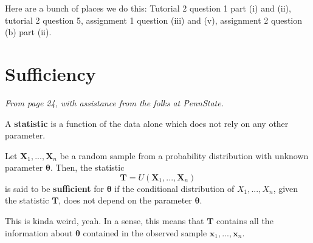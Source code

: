 \begin{exercise}
    Here are a bunch of places we do this: Tutorial 2 question 1 part (i) and (ii), tutorial 2 question 5, assignment 1 question (iii) and (v), assignment 2 question (b) part (ii).
\end{exercise}

\section{Sufficiency}\label{sec:sufficiency}

\textit{From page 24, with assistance from the folks at PennState\autocite{penn415}.}



A \textbf{statistic} is a function of the data alone which does not rely on any other parameter. 


\begin{definition}[Sufficient]\label{defn:sufficient}
    Let \(\bm{X}_1,...,\bm{X}_n\) be a random sample from a probability distribution with unknown parameter \(\bm{\theta}\). 
    Then, the statistic
    \[\bm{T} = U(\bm{X}_1,...,\bm{X}_n)\]
    is said to be \textbf{sufficient} for \(\bm{\theta}\) if the conditional distribution of \(X_1,...,X_n\), 
    given the statistic \(\bm{T}\), does not depend on the parameter \(\bm{\theta}\). 
\end{definition}

This is kinda weird, yeah. In a sense, this means that \(\bm{T}\) contains 
all the information about \(\bm{\theta}\) contained in the observed sample 
\(\bm{x}_1,...,\bm{x}_n\). 


    

